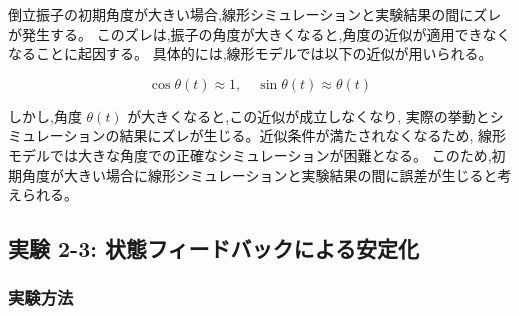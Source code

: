 倒立振子の初期角度が大きい場合,線形シミュレーションと実験結果の間にズレが発生する。
このズレは,振子の角度が大きくなると,角度の近似が適用できなくなることに起因する。
具体的には,線形モデルでは以下の近似が用いられる。

\[
  \cos \theta(t) \approx 1, \quad \sin \theta(t) \approx \theta(t)
\]

しかし,角度 \( \theta(t) \) が大きくなると,この近似が成立しなくなり,
実際の挙動とシミュレーションの結果にズレが生じる。近似条件が満たされなくなるため,
線形モデルでは大きな角度での正確なシミュレーションが困難となる。
このため,初期角度が大きい場合に線形シミュレーションと実験結果の間に誤差が生じると考えられる。


\subsection{実験 2-3: 状態フィードバックによる安定化}
\subsubsection{実験方法}

